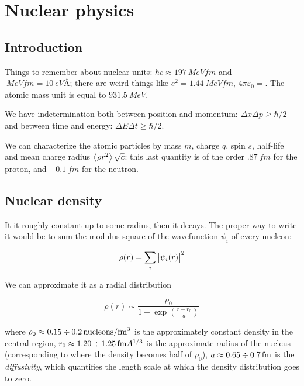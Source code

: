\documentclass[main.tex]{subfiles}
\begin{document}
\chapter{Nuclear physics}

\section{Introduction}

Things to remember about nuclear units: \(\hbar c \approx \SI{197}{MeV fm} \) and \(\SI{}{MeV fm} = \SI{10}{eV \angstrom} \); there are weird things like \(e^2 = \SI{1.44}{MeV fm} \), \(4 \pi \varepsilon_0 = \). The atomic mass unit is equal to \(\SI{931.5}{MeV} \).

We have indetermination both between position and momentum: \(\Delta x \Delta p \geq \hbar/2\) and between time and energy: \(\Delta E \Delta t \geq \hbar /2\).

We can characterize the atomic particles by mass \(m\), charge \(q\), spin \(s\), half-life and mean charge radius \(\expval{\rho r^2} \sqrt{c} \): this last quantity is of the order \(\SI{.87}{fm}\) for the proton, and \(\SI{-0.1}{fm} \) for the neutron.

\section{Nuclear density}

It it roughly constant up to some radius, then it decays.
The proper way to write it would be to sum the modulus square of the wavefunction \(\psi_i\) of every nucleon:

\begin{equation}
    \rho(r) = \sum _{i} \abs{\psi_i (r)}^2
\end{equation}

We can approximate it as a radial distribution

\begin{equation}
    \rho(r) \sim \frac{\rho_0}{1 + \exp(\frac{r - r_0}{a})}
\end{equation}

where \(\rho_0 \approx 0.15 \divisionsymbol \SI{0.2}{ nucleons  \per fm^3} \) is the approximately constant density in the central region, \(r_0 \approx 1.20 \divisionsymbol \SI{1.25}{fm} A ^{1/3}  \) is the approximate radius of the nucleus (corresponding to where the density becomes half of \(\rho_0\)), \(a \approx 0.65 \divisionsymbol \SI{0.7}{fm} \) is the \emph{diffusivity}, which quantifies the length scale at which the density distribution goes to zero.
\end{document}
